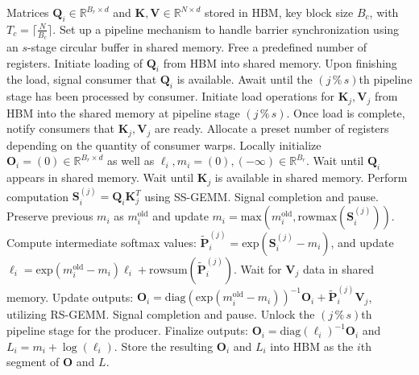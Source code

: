 \begin{algorithm}[H]
    \caption{\small\label{alg:flash3_wgmma_ws_only}\textsc{FlashAttention-3} forward computation \textbf{excluding} intra-consumer overlap -- CTA perspective}
    \begin{algorithmic}[1]
\REQUIRE Matrices $\mathbf{Q}_i \in \mathbb{R}^{B_r \times d}$ and $\mathbf{K}, \mathbf{V} \in \mathbb{R}^{N \times d}$ stored in HBM, key block size $B_c$, with $T_c = \lceil \frac{N}{B_c} \rceil$.
\STATE Set up a pipeline mechanism to handle barrier synchronization using an $s$-stage circular buffer in shared memory.
\STATE Free a predefined number of registers.
\STATE Initiate loading of $\mathbf{Q}_i$ from HBM into shared memory.
\STATE Upon finishing the load, signal consumer that $\mathbf{Q}_i$ is available.
    \STATE Await until the $(j\,\%\,s)$th pipeline stage has been processed by consumer.
    \STATE Initiate load operations for $\mathbf{K}_j, \mathbf{V}_j$ from HBM into the shared memory at pipeline stage $(j\,\%\,s)$.
    \STATE Once load is complete, notify consumers that $\mathbf{K}_j, \mathbf{V}_j$ are ready.
\ENDFOR
\ELSE \STATE Allocate a preset number of registers depending on the quantity of consumer warps.
\STATE Locally initialize $\mathbf{O}_i = (0) \in \mathbb{R}^{B_r \times d}$ as well as $\ell_i, m_i = (0), (-\infty) \in \mathbb{R}^{B_r}$.
\STATE Wait until $\mathbf{Q}_i$ appears in shared memory.
\STATE Wait until $\mathbf{K}_j$ is available in shared memory.
\STATE Perform computation $\mathbf{S}_i^{(j)} = \mathbf{Q}_i \mathbf{K}_j^T$ using SS-GEMM. Signal completion and pause. \label{alg:ws_only_gemm1}
\STATE Preserve previous $m_i$ as $m_i^{\mathrm{old}}$ and update $m_i = \mathrm{max}(m_i^{\mathrm{old}}, \mathrm{rowmax}(\mathbf{S}_i^{(j)}))$. \label{code-ws:softmax_start}
\STATE Compute intermediate softmax values: $\widetilde{\mathbf{P}}_i^{(j)} = \mathrm{exp}(\mathbf{S}_i^{(j)} - m_i)$, and update $\ell_i = \mathrm{exp}(m_i^{\mathrm{old}} - m_i) \ell_i + \mathrm{rowsum}(\widetilde{\mathbf{P}}_i^{(j)})$. \label{code-ws:softmax_end}
\STATE Wait for $\mathbf{V}_j$ data in shared memory.
\STATE Update outputs: $\mathbf{O}_i = \mathrm{diag}(\mathrm{exp}(m_i^{\mathrm{old}} - m_i))^{-1} \mathbf{O}_i + \widetilde{\mathbf{P}}_i^{(j)} \mathbf{V}_j$, utilizing RS-GEMM. Signal completion and pause. \label{alg:ws_only_gemm2}
\STATE Unlock the $(j\,\%\,s)$th pipeline stage for the producer.
\ENDFOR
\STATE Finalize outputs: $\mathbf{O}_i = \mathrm{diag}(\ell_i)^{-1} \mathbf{O}_i$ and $L_i = m_i + \log(\ell_i)$.
\STATE Store the resulting $\mathbf{O}_i$ and $L_i$ into HBM as the $i$th segment of $\mathbf{O}$ and $L$.
\ENDIF
\end{algorithmic}
\end{algorithm}

